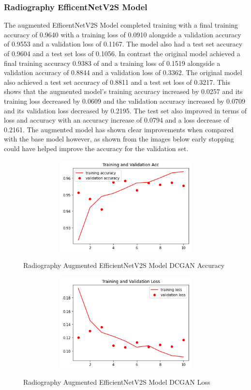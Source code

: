 \subsubsection{Radiography EfficentNetV2S Model}
The augmented EfficentNetV2S Model completed training with a final training accuracy of 0.9640 with a training loss of 0.0910 alongside a validation accuracy of 0.9553 and a validation loss of 0.1167.  The model also had a test set accuracy of 0.9604 and a test set loss of 0.1056.  In contrast the original model achieved a final training accuracy 0.9383  of and a training loss of 0.1519 alongside a validation accuracy of 0.8844 and a validation loss of 0.3362.  The original model also achieved a test set accuracy of 0.8811 and a test set loss of 0.3217.  This shows that the augmented model's training accuracy increased by 0.0257 and its training loss decreased by 0.0609 and the validation accuracy increased by 0.0709 and its validation loss decreased by 0.2195.  The test set also improved in terms of loss and accuracy with an accuracy increase of 0.0794 and a loss decrease of 0.2161.   The augmented model has shown clear improvements when compared with the base model however, as shown from the images below early stopping could have helped improve the accuracy for the validation set.
 \begin{figure}[H]
    \centering    \includegraphics[width=1\textwidth,height=5cm,keepaspectratio]{Images/EfficientNetV2SBaselineTrainingValidationAccRadiographyAugmentedDCGAN.png}\\
    \caption{Radiography Augmented EfficientNetV2S Model DCGAN Accuracy}
    \label{fig:Radiography Augmented EfficientNetV2S Model DCGAN Accuracy}
\end{figure}
 \begin{figure}[H]
    \centering
    \includegraphics[width=1\textwidth,height=5cm,keepaspectratio]{Images/EfficientNetV2SBaselineTrainingValidationLossRadiographyAugmentedDCGAN.png}\\
    \caption{Radiography Augmented EfficientNetV2S Model DCGAN Loss}
    \label{fig:Radiography Augmented EfficientNetV2S Model DCGAN Loss}
\end{figure}
